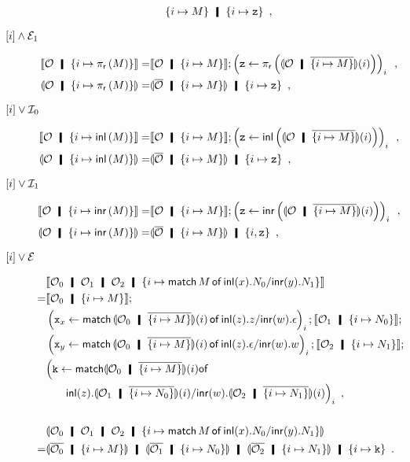 \begin{description}
\begin{align*}
{ \imapsto{M}}\hmid \{{i\mapsto \p z}\}\enspace,
\end{align*}
 \item[$\lbrack {i}\rbrack\wedge\mathcal E_1$]
\begin{align*}
 \semo{\hypert\hmid \imapsto{\lpir M}} =& \semo{\hypert\hmid \imapsto{M}};
 \left(\p z \leftarrow
 \lpir{ \semoi{\hypert\hmid\overline{\imapsto{M}}}(i) }\right)_i\enspace, \\
 \semoi{\hypert\hmid \imapsto{\lpir{M}}}=& \semoi{\overline \hypert\hmid
 \imapsto{M}}\hmid
 \{{i\mapsto \p z}\}\enspace,
\end{align*}
 \item[$\lbrack {i}\rbrack\vee\mathcal I_0$]
\begin{align*}
 \semo{\hypert\hmid \imapsto{\linl{M}}} =
 & \semo{\hypert\hmid \imapsto{M}}; \left(\p z \leftarrow
 \linl{ \semoi{\hypert\hmid\overline{\imapsto{M}}}(i)}\right)_i\enspace, \\
 \semoi{\hypert\hmid \imapsto{\linl M}}=& \semoi{\overline \hypert\hmid
 \imapsto{M}}
 \hmid
 \{{i\mapsto \p z}\}\enspace,
\end{align*}
 \item[$\lbrack {i}\rbrack\vee\mathcal I_1$]
\begin{align*}
 \semo{\hypert\hmid \imapsto{\linr M}} =& \semo{\hypert\hmid \imapsto{M}};
 \left(\p z \leftarrow
 \linr{\semoi{\hypert\hmid\overline{\imapsto{M}}}(i)}\right)_i\enspace, \\
 \semoi{\hypert\hmid \imapsto{\linr{M}}}=& \semoi{\overline \hypert\hmid
 \imapsto{M}}\hmid
 \{{i, \p z}\}\enspace,
\end{align*}
 \item[$\lbrack {i}\rbrack\vee\mathcal E$]
\begin{align*}
 &\semo{\hypert_0\hmid \hypert_1\hmid \hypert_2\hmid \{i\mapsto
 \mat M x{N_0}y{N_1}\}}
 \\
 =&\semo{\hypert_0\hmid\imapsto{M}};\\&
 \left(\p x_x\leftarrow
 \mat{\semoi{\hypert_0\hmid\overline{\imapsto{M}}}(i)}{z}{z}{w}{\epsilon}\right)_i;
 \semo{\hypert_1\hmid\imapsto{N_0}};\\&
 \left(\p x_y\leftarrow
 \mat{\semoi{\hypert_0\hmid\overline{\imapsto{M}}}(i)}{z}{\epsilon}{w}{w}\right)_i;
 \semo{\hypert_2\hmid\imapsto{N_1}};\\&
 \Big(\p k \leftarrow
 \mathsf{match}
 {\semoi{\hypert_0\hmid\overline{\imapsto{M}}}(i)}
 \mathsf{of} \\
 &\phantom{k\leftarrow}\inl{z}. {\semoi{\hypert_1\hmid\overline{\imapsto{N_0}}}(i)}/\inr{w}. {\semoi{\hypert_2\hmid\overline{\imapsto{N_1}}}(i)}\Big)_i\enspace,
 \\
 \\
 &\semoi{\hypert_0\hmid \hypert_1\hmid \hypert_2\hmid \{i\mapsto
 \mat M x{N_0}y{N_1}\}}\\
 =&
 \semoi{\overline{\hypert_0}\hmid \imapsto{M}}\hmid
 \semoi{\overline{\hypert_1}\hmid \imapsto{N_0}}\hmid
 \semoi{\overline{\hypert_2}\hmid \imapsto{N_1}}\hmid \imapsto{\p k}\enspace.
\end{align*}
\end{description}
